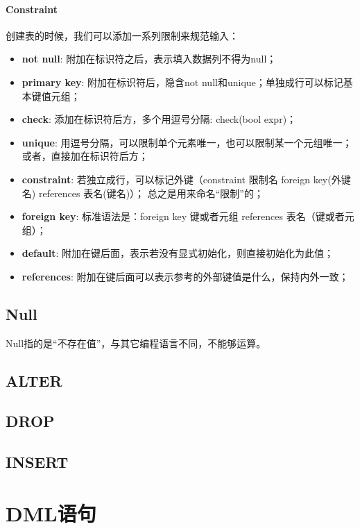 \documentclass[12pt,a4paper,UTF8]{ctexbook}
\theoremstyle{plain}
\begin{document}
\paragraph{Constraint} 创建表的时候，我们可以添加一系列限制来规范输入：
\begin{itemize} 
    \item \textbf{not null}: 附加在标识符之后，表示填入数据列不得为null；
    \item \textbf{primary key}: 附加在标识符后，隐含not null和unique；单独成行可以标记基本键值元组；
    \item \textbf{check}: 添加在标识符后方，多个用逗号分隔: check(bool expr)； 
    \item \textbf{unique}: 用逗号分隔，可以限制单个元素唯一，也可以限制某一个元组唯一；或者，直接加在标识符后方； 
    \item \textbf{constraint}: 若独立成行，可以标记外键（constraint 限制名 foreign key(外键名) references 表名(键名)）；
                               总之是用来命名“限制”的；
    \item \textbf{foreign key}: 标准语法是：foreign key 键或者元组 references 表名（键或者元组）；
    \item \textbf{default}: 附加在键后面，表示若没有显式初始化，则直接初始化为此值；
    \item \textbf{references}: 附加在键后面可以表示参考的外部键值是什么，保持内外一致；
\end{itemize} 

\subsection{Null} 
Null指的是“不存在值”，与其它编程语言不同，不能够运算。

\subsection{ALTER}

\subsection{DROP}

\subsection{INSERT}

\section{DML语句}
\end{document}
